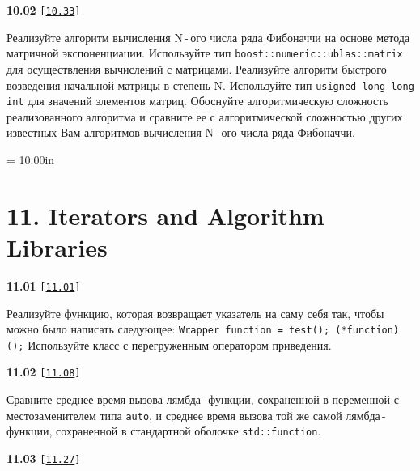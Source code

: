 \documentclass[a4paper,12pt]{article}
\begin{document}
{\large \textbf{10.02} \texttt{[\href{https://github.com/i-s-m-mipt/Education/blob/master/projects/examples/source/10.33.cpp}{\texttt{10.33}}]}}

\bigskip

Реализуйте алгоритм вычисления N\,-\,ого числа ряда Фибоначчи на основе метода матричной экспоненциации. Используйте тип \lstinline{boost::numeric::ublas::matrix} для осуществления вычислений с матрицами. Реализуйте алгоритм быстрого возведения начальной матрицы в степень N. Используйте тип \lstinline{usigned long long int} для значений элементов матриц. Обоснуйте алгоритмическую сложность реализованного алгоритма и сравните ее с алгоритмической сложностью других известных Вам алгоритмов вычисления N\,-\,ого числа ряда Фибоначчи.



\newpage\thispagestyle{empty}\pdfpageheight = 10.00in\enlargethispage{100in}

\section{11. Iterators and Algorithm Libraries}

{\large \textbf{11.01} \texttt{[\href{https://github.com/i-s-m-mipt/Education/blob/master/projects/examples/source/11.01.cpp}{\texttt{11.01}}]}}

\bigskip

Реализуйте функцию, которая возвращает указатель на саму себя так, чтобы можно было написать следующее: \lstinline{Wrapper function = test(); (*function)();} Используйте класс с перегруженным оператором приведения.

\bigskip

{\large \textbf{11.02} \texttt{[\href{https://github.com/i-s-m-mipt/Education/blob/master/projects/examples/source/11.08.cpp}{\texttt{11.08}}]}}

\bigskip

Сравните среднее время вызова лямбда\,-\,функции, сохраненной в переменной с местозаменителем типа \lstinline{auto}, и среднее время вызова той же самой лямбда\,-\,функции, сохраненной в стандартной оболочке \lstinline{std::function}.

\bigskip

{\large \textbf{11.03} \texttt{[\href{https://github.com/i-s-m-mipt/Education/blob/master/projects/examples/source/11.27.cpp}{\texttt{11.27}}]}}

\bigskip
\end{document}
